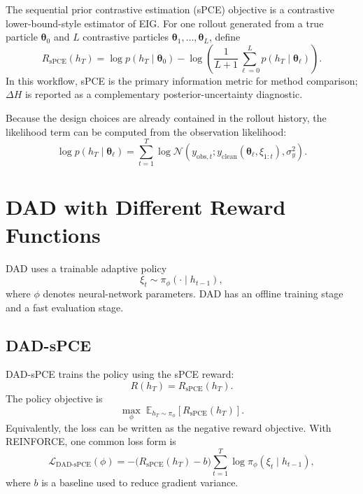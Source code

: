 \documentclass[11pt]{article}
\newcommand{\thetaVec}{\bm{\theta}}
\newcommand{\Normal}{\mathcal{N}}
\begin{document}
The sequential prior contrastive estimation (sPCE) objective is a contrastive lower-bound-style estimator of EIG. For one rollout generated from a true particle $\thetaVec_0$ and $L$ contrastive particles $\thetaVec_1,\ldots,\thetaVec_L$, define
\begin{equation}
 R_{\mathrm{sPCE}}(h_T)
 =
 \log p(h_T\mid \thetaVec_0)
 -
 \log\left(
 \frac{1}{L+1}
 \sum_{\ell=0}^{L}p(h_T\mid \thetaVec_\ell)
 \right).
\end{equation}
In this workflow, sPCE is the primary information metric for method comparison; $\Delta H$ is reported as a complementary posterior-uncertainty diagnostic.

Because the design choices are already contained in the rollout history, the likelihood term can be computed from the observation likelihood:
\begin{equation}
 \log p(h_T\mid \thetaVec_\ell)
 =
 \sum_{t=1}^{T}
 \log
 \Normal\!\left(
 y_{\mathrm{obs},t};
 y_{\mathrm{clean}}(\thetaVec_\ell,\xi_{1:t}),
 \sigma_y^2
 \right).
\end{equation}

\section{DAD with Different Reward Functions}

DAD uses a trainable adaptive policy
\begin{equation}
 \xi_t\sim \pi_\phi(\cdot\mid h_{t-1}),
\end{equation}
where $\phi$ denotes neural-network parameters. DAD has an offline training stage and a fast evaluation stage.

\subsection{DAD-sPCE}

DAD-sPCE trains the policy using the sPCE reward:
\begin{equation}
 R(h_T)=R_{\mathrm{sPCE}}(h_T).
\end{equation}
The policy objective is
\begin{equation}
 \max_\phi\; \mathbb{E}_{h_T\sim \pi_\phi}[R_{\mathrm{sPCE}}(h_T)].
\end{equation}
Equivalently, the loss can be written as the negative reward objective. With REINFORCE, one common loss form is
\begin{equation}
 \mathcal{L}_{\mathrm{DAD\mbox{-}sPCE}}(\phi)
 =
 -\big(R_{\mathrm{sPCE}}(h_T)-b\big)
 \sum_{t=1}^{T}
 \log \pi_\phi(\xi_t\mid h_{t-1}),
\end{equation}
where $b$ is a baseline used to reduce gradient variance.
\end{document}
